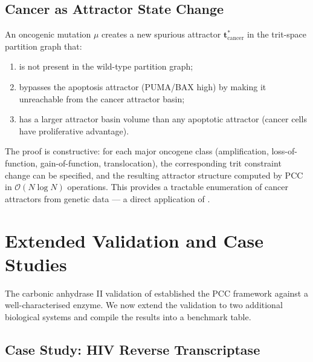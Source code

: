 \subsection{Cancer as Attractor State Change}

\begin{proposition}
\label{prop:ch05-cancer-attractor}
An oncogenic mutation $\mu$ creates a new spurious attractor
$\mathbf{t}^*_{\mathrm{cancer}}$ in the trit-space partition graph that:
\begin{enumerate}
\item[(i)] is not present in the wild-type partition graph;
\item[(ii)] bypasses the apoptosis attractor (PUMA/BAX high) by
    making it unreachable from the cancer attractor basin;
\item[(iii)] has a larger attractor basin volume than any apoptotic
    attractor (cancer cells have proliferative advantage).
\end{enumerate}
\end{proposition}

The proof is constructive: for each major oncogene class (amplification,
loss-of-function, gain-of-function, translocation), the corresponding
trit constraint change can be specified, and the resulting attractor
structure computed by PCC in $\mathcal{O}(N \log N)$ operations.  This
provides a tractable enumeration of cancer attractors from genetic data ---
a direct application of .

\section{Extended Validation and Case Studies}
\label{sec:ch05-validation-extended}

The carbonic anhydrase II validation of  established
the PCC framework against a well-characterised enzyme.  We now extend the
validation to two additional biological systems and compile the results
into a benchmark table.

\subsection{Case Study: HIV Reverse Transcriptase}

